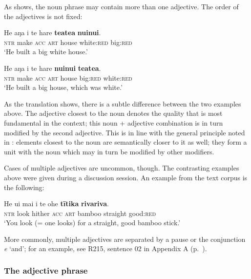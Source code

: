 As  shows, the noun phrase may contain more than one adjective. The order of the adjectives is not fixed:

\ea\label{ex:5.135}
\gll He aŋa i te hare \textbf{teatea} \textbf{nuinui}. \\
\textsc{ntr} make \textsc{acc} \textsc{art} house white:\textsc{red} big:\textsc{red} \\

\glt 
‘He built a big white house.’ \textstyleExampleref{[Notes]}
\z

\ea\label{ex:5.136}
\gll He aŋa i te hare \textbf{nuinui} \textbf{teatea}. \\
\textsc{ntr} make \textsc{acc} \textsc{art} house big:\textsc{red} white:\textsc{red} \\

\glt
‘He built a big house, which was white.’ \textstyleExampleref{[Notes]}
\z

As the translation shows, there is a subtle difference between the two examples above. The adjective closest to the noun denotes the quality that is most fundamental in the context; this noun + adjective combination is in turn modified by the second adjective. This is in line with the general principle noted in : elements closest to the noun are semantically closer to it as well; they form a unit with the noun which may in turn be modified by other modifiers.

Cases of multiple adjectives are uncommon, though. The contrasting examples above were given during a discussion session. An example from the text corpus is the following:

\ea\label{ex:5.137}
\gll He u{\ꞌ}i mai i te {\ꞌ}ohe \textbf{tītika} \textbf{rivariva}. \\
\textsc{ntr} look hither \textsc{acc} \textsc{art} bamboo straight good:\textsc{red} \\

\glt
‘You look (= one looks) for a straight, good bamboo stick.’ \textstyleExampleref{[R360.015]} 
\z

More commonly, multiple adjectives are separated by a pause or the conjunction \textit{{\ꞌ}e} ‘and’; for an example, see R215, sentence 02 in Appendix A (p.~\pageref{sec:a.1}).

\subsubsection[The adjective phrase]{The adjective phrase}\label{sec:5.7.3.2}

